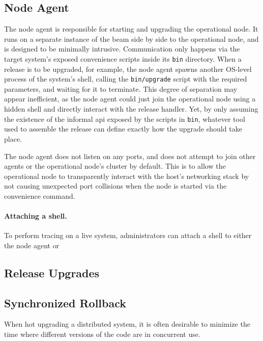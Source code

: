\subsection{Node Agent}

The node agent is responsible for starting and upgrading the operational node. It runs on a separate instance of the \acrshort{beam} side by side to the operational node, and is designed to be minimally intrusive. Communication only happens via the target system's exposed convenience scripts inside its \lstinline|bin| directory. When a release is to be upgraded, for example, the node agent spawns another OS-level process of the system's shell, calling the \lstinline|bin/upgrade| script with the required parameters, and waiting for it to terminate. This
degree of separation may appear inefficient, as the node agent could just join the operational node using a hidden shell and directly interact with the release handler. Yet, by only assuming the existence of the informal \acrshort{api} exposed by the scripts in \lstinline|bin|, whatever tool used to assemble the release can define exactly how the upgrade should take place.



The node agent does not listen on any ports, and does not attempt to join other agents or the operational node's cluster by default. This is to allow the operational node to transparently interact with the host's networking stack by not causing unexpected port collisions when the node is started via the convenience command.


\paragraph{Attaching a shell.}
To perform tracing on a live system, administrators can attach a shell to either the node agent or


\subsection{Release Upgrades}

\subsection{Synchronized Rollback}
When hot upgrading a distributed system, it is often desirable to minimize the time where different versions of the code are in concurrent use.
